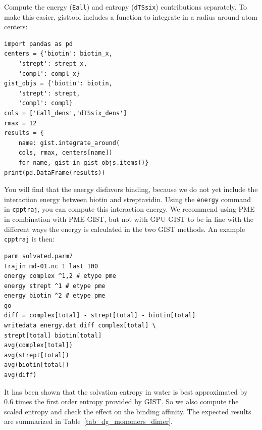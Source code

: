 \documentclass[9pt,tutorial]{livecoms}
\newcommand{\software}{\texttt}
\newcommand\inlinecode{\texttt}
\begin{document}
Compute the energy (\inlinecode{Eall}) and entropy (\inlinecode{dTSsix}) contributions separately.
 To make this easier, gisttool includes a function to integrate in a radius around atom centers:
\begin{lstlisting}[style=python]
import pandas as pd
centers = {'biotin': biotin_x, 
    'strept': strept_x, 
    'compl': compl_x}
gist_objs = {'biotin': biotin, 
    'strept': strept, 
    'compl': compl}
cols = ['Eall_dens','dTSsix_dens']
rmax = 12
results = {
    name: gist.integrate_around(
    cols, rmax, centers[name])
    for name, gist in gist_objs.items()}
print(pd.DataFrame(results))
\end{lstlisting}
You will find that the energy disfavors binding, because we do not yet include the interaction energy between biotin and streptavidin.
Using the \inlinecode{energy} command in \software{cpptraj}, you can compute this interaction energy.
We recommend using PME in combination with PME-GIST, but not with GPU-GIST to be in line with the different ways the energy is calculated in the two GIST methods.
An example \software{cpptraj} is then:
\begin{lstlisting}[style=cpptraj]
parm solvated.parm7
trajin md-01.nc 1 last 100
energy complex ^1,2 # etype pme
energy strept ^1 # etype pme
energy biotin ^2 # etype pme
go
diff = complex[total] - strept[total] - biotin[total]
writedata energy.dat diff complex[total] \
strept[total] biotin[total]
avg(complex[total])
avg(strept[total])
avg(biotin[total])
avg(diff)
\end{lstlisting}
It has been shown \cite{Chen2021,Waibl2022-gist-solvents} that the solvation entropy in water is best approximated by 0.6 times the first order entropy provided by GIST.
So we also compute the scaled entropy and check the effect on the binding affinity.
The expected results are summarized in Table~\ref{tab_dg_monomers_dimer}.
\end{document}
